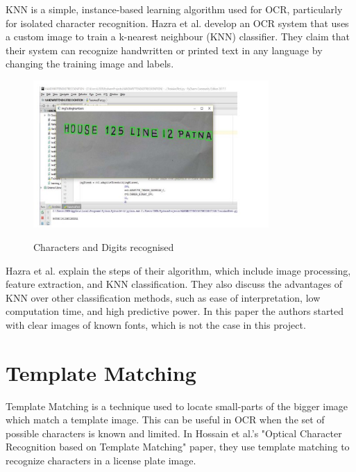 KNN is a simple, instance-based learning algorithm used for OCR, particularly for isolated character recognition. Hazra et al. develop an OCR system that uses a custom image to train a k-nearest neighbour (KNN) classifier. They claim that their system can recognize handwritten or printed text in any language by changing the training image and labels. \cite{hazraOpticalCharacterRecognition2017}

\begin{figure}[!h]
    \centering
    \includegraphics[width=0.8\textwidth]{Figures/KNN_Hazra.jpg}
    \caption[Optical Character Recognition using KNN on Custom
        Image Dataset]{Characters and Digits recognised}\cite{joshuaDevelopmentImageProcessing2023}
    \label{fig:Hazra OCR KNN Paper}
\end{figure}

Hazra et al. explain the steps of their algorithm, which include image processing, feature extraction, and KNN classification. They also discuss the advantages of KNN over other classification methods, such as ease of interpretation, low computation time, and high predictive power. In this paper the authors started with clear images of known fonts, which is not the case in this project.


\newpage

\section{Template Matching}

Template Matching is a technique used to locate small-parts of the bigger image which match a template image. This can be useful in OCR when the set of possible characters is known and limited. In Hossain et al.'s "Optical Character Recognition based on Template Matching" paper, they use template matching to recognize characters in a license plate image.

